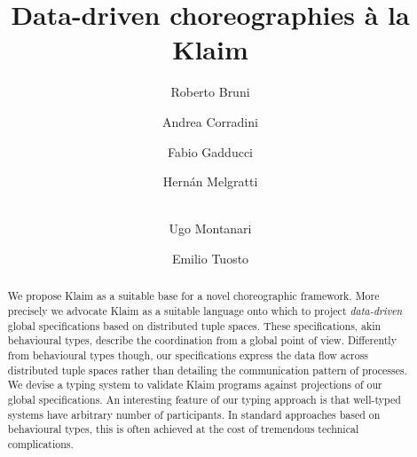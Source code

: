 \documentclass[runningheads,a4paper]{llncs}
\begin{document}
\mainmatter  %

\title{
  \iffinal
  Data-driven choreographies \`a la Klaim
  \else
  \fi
}


%
%

\author{
  Roberto Bruni  \and
  Andrea Corradini  \and
  Fabio Gadducci  \and
  Hern\'an Melgratti  \and
  \\
  Ugo Montanari  \and
  Emilio Tuosto
}

\iffinal
\else
{}
\fi

\maketitle

\begin{abstract}
  We propose Klaim as a suitable base for a novel choreographic
  framework.
  More precisely we advocate Klaim as a suitable language onto which
  to project \emph{data-driven} global specifications based on
  distributed tuple spaces.
  These specifications, akin behavioural types, describe the coordination
  from a global point of view.
  Differently from behavioural types though, our specifications
  express the data flow across distributed tuple spaces rather than
  detailing the communication pattern of processes.
  We devise a typing system to validate Klaim programs against projections
  of our global specifications.
  An interesting feature of our typing approach is that well-typed
  systems have arbitrary number of participants.
  In standard approaches based on behavioural types, this is often
  achieved at the cost of tremendous technical complications.
\end{abstract}
\end{document}
